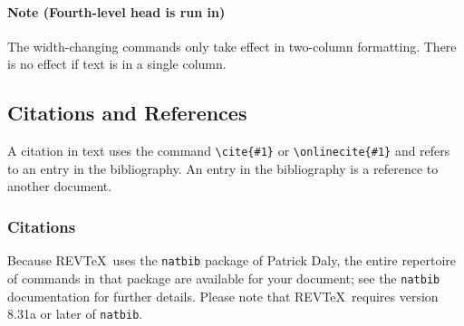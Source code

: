 \documentclass[%
 reprint,
 amsmath,amssymb,
 aps,
]{revtex4-2}
\begin{document}
\paragraph{Note (Fourth-level head is run in)}
The width-changing commands only take effect in two-column formatting. 
There is no effect if text is in a single column.

\subsection{\label{sec:citeref}Citations and References}
A citation in text uses the command \verb+\cite{#1}+ or
\verb+\onlinecite{#1}+ and refers to an entry in the bibliography. 
An entry in the bibliography is a reference to another document.

\subsubsection{Citations}
Because REV\TeX\ uses the \verb+natbib+ package of Patrick Daly, 
the entire repertoire of commands in that package are available for your document;
see the \verb+natbib+ documentation for further details. Please note that
REV\TeX\ requires version 8.31a or later of \verb+natbib+.
\end{document}
